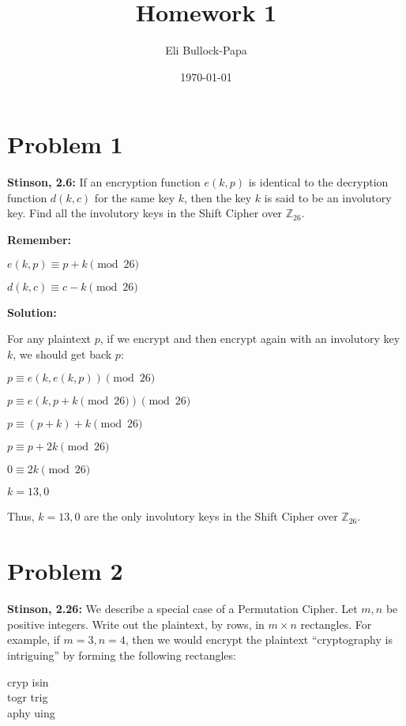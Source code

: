 \documentclass[12pt]{article}
\title{Homework 1}
\author{Eli Bullock-Papa}
\date{\today}
\begin{document}
\maketitle

\section*{Problem 1}
\textbf{Stinson, 2.6:} If an encryption function $e(k, p)$ is identical to the decryption function $d(k, c)$ for the same key $k$, then the key $k$ is said to be an involutory key. Find all the involutory keys in the Shift Cipher over $\mathbb{Z}_{26}$.
\vspace{1em}

\textbf{Remember:} 

$e(k, p) \equiv p + k \pmod{26}$ 

$d(k, c) \equiv c - k \pmod{26}$

\vspace{1em}
\textbf{Solution:}

For any plaintext $p$, if we encrypt and then encrypt again with an involutory key $k$, we should get back $p$:

$p \equiv e(k, e(k, p)) \pmod{26}$

$p \equiv e(k, p + k \pmod{26}) \pmod{26}$

$p \equiv (p + k) + k \pmod{26}$

$p \equiv p + 2k \pmod{26}$

$0 \equiv 2k \pmod{26}$

$k = 13, 0$

Thus, $k = 13, 0$ are the only involutory keys in the Shift Cipher over $\mathbb{Z}_{26}$.

\newpage
\section*{Problem 2}
\textbf{Stinson, 2.26:} We describe a special case of a Permutation Cipher. Let $m,n$ be positive integers. Write out the plaintext, by rows, in $m \times n$ rectangles. For example, if $m = 3, n = 4$, then we would encrypt the plaintext ``cryptography is intriguing'' by forming the following rectangles:

\begin{center}
cryp \quad isin\\
togr \quad trig\\
aphy \quad uing
\end{center}
\end{document}
